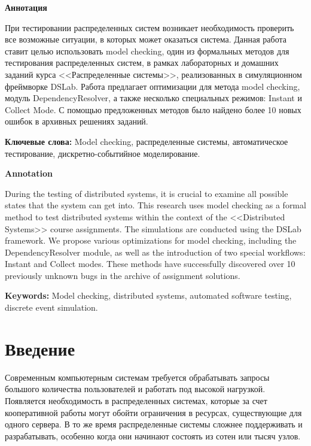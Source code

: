 \documentclass[a4paper,12pt]{extarticle}
\begin{document}
\newpage

{
	\hypersetup{linkcolor=black}
	\tableofcontents
}

\newpage

\textbf{Аннотация}

При тестировании распределенных систем возникает необходимость проверить все возможные ситуации, в которых может оказаться система.
Данная работа ставит целью использовать model checking, один из формальных методов для тестирования распределенных систем, в рамках лабораторных и домашних заданий курса <<Распределенные системы>>, реализованных в симуляционном фреймворке DSLab.
Работа предлагает оптимизации для метода model checking, модуль DependencyResolver, а также несколько специальных режимов: Instant и Collect Mode.
С помощью предложенных методов было найдено более 10 новых ошибок в архивных решениях заданий.

\textbf{Ключевые слова:} Model checking, распределенные системы, автоматическое тестирование,  дискретно-событийное моделирование.

\hfill

\textbf{Annotation}

During the testing of distributed systems, it is crucial to examine all possible states that the system can get into.
This research uses model checking as a formal method to test distributed systems within the context of the <<Distributed Systems>> course assignments.
The simulations are conducted using the DSLab framework.
We propose various optimizations for model checking, including the DependencyResolver module, as well as the introduction of two special workflows: Instant and Collect modes.
These methods have successfully discovered over 10 previously unknown bugs in the archive of assignment solutions.

\textbf{Keywords:} Model checking, distributed systems, automated software testing, discrete event simulation.

\newpage

\section{Введение}

Современным компьютерным системам требуется обрабатывать запросы большого количества пользователей и работать под высокой нагрузкой.
Появляется необходимость в распределенных системах, которые за счет кооперативной работы могут обойти ограничения в ресурсах, существующие для одного сервера.
В то же время распределенные системы сложнее поддерживать и разрабатывать, особенно когда они начинают состоять из сотен или тысяч узлов.
\end{document}
